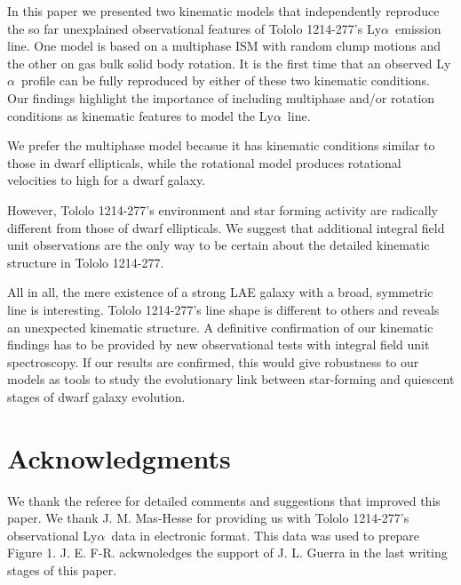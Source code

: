 \documentclass[a4,useAMS,usenatbib,usegraphicx]{mn2e}
\newcommand{\tol}{Tololo 1214-277}
\newcommand{\lya}{Ly$\alpha$}
\begin{document}
In this paper we presented two kinematic models that independently
reproduce the so far unexplained observational features of \tol's
\lya\ emission line.  
One model is based on a multiphase ISM with random clump motions and
the other on gas bulk solid body rotation. 
It is the first time that an observed \lya\ profile can be fully
reproduced by either of these two kinematic conditions.
Our findings highlight the importance of including multiphase and/or
rotation conditions as kinematic features to model the \lya\ line.

We prefer the multiphase model becasue it has kinematic
conditions similar to those in dwarf ellipticals, while the
rotational model produces rotational velocities to high for a dwarf
galaxy.  

However, \tol's environment and star forming activity are radically
different from those of dwarf ellipticals.
We suggest that additional integral field unit observations are the
only way to be certain about the detailed kinematic structure in \tol.

All in all, the mere existence of a strong LAE galaxy with a broad,
symmetric line is interesting. 
\tol's line shape is different to others and reveals an unexpected
kinematic structure.
A definitive confirmation of our kinematic findings has
to be provided by new observational tests with integral field unit
spectroscopy. 
If our results are confirmed, this would give robustness to our models
as tools to study the evolutionary link between star-forming and
quiescent stages of dwarf galaxy evolution.   
 
\section*{Acknowledgments}
We thank the referee for detailed comments and suggestions that
improved this paper. 
We thank J. M. Mas-Hesse for providing us with \tol's observational
\lya\ data \citep{mashesse03} in electronic format. This data was
used to prepare Figure 1.
J. E. F-R. ackwnoledges the support of J. L. Guerra in the last
writing stages of this paper.
\end{document}
